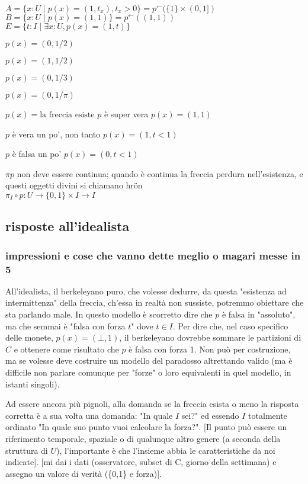 \documentclass[a4paper, 11pt]{article}
\begin{document}
$A = \{x : U \mid p(x) = (1,t_x), t_x > 0\} = p^\leftarrow(\{1\}\times (0,1])$ \\
$B = \{x : U \mid p(x) = (1,1)\} = p^\leftarrow((1,1))$ \\
$E = \{t : I \mid \exists x : U, p(x)=(1,t)\}$ 

$p(x) = (0,1/2)$

$p(x) = (1,1/2)$


$p(x) = (0,1/3)$

$p(x) = (0,1/\pi)$

$p(x) = \text{la freccia esiste}$
$p$ è super vera
$p(x)=(1,1)$

$p$ è vera un po', non tanto
$p(x) =(1,t<1)$

$p$ è falsa un po'
$p(x) =(0,t<1)$

$\pi p$ non deve essere continua; quando è continua la freccia perdura nell'esistenza, e questi oggetti divini si chiamano hrön \\
$\pi_I \circ p : U \to \{0,1\}\times I \to I$


\subsection{risposte all'idealista} 
\subsubsection{impressioni e cose che vanno dette meglio o magari messe in 5}
All'idealista, il berkeleyano puro, che volesse dedurre, da questa "esistenza ad intermittenza" della freccia, ch'essa in realtà non sussiste, potremmo obiettare che sta parlando male. In questo modello è scorretto dire che $p$ è falsa in "assoluto", ma che semmai è "falsa con forza $t$" dove $t \in I$. Per dire che, nel caso specifico delle monete, $p(x) = (\bot,1)$, il  berkeleyano dovrebbe sommare le partizioni di $C$ e ottenere come risultato che $p$ è falsa con forza 1. Non può per costruzione, ma se volesse deve costruire un modello del paradosso altrettando valido (ma è difficile non parlare comunque per "forze" o loro equivalenti in quel modello, in istanti singoli). 

Ad essere ancora più pignoli, alla domanda se la freccia esista o meno la risposta corretta è a sua volta una domanda: "In quale $I$ sei?" ed essendo $I$ totalmente ordinato "In quale suo punto vuoi calcolare la forza?". [Il punto può essere un riferimento temporale, spaziale o di qualunque altro genere (a seconda della struttura di $U$), l'importante è che l'insieme abbia le caratteristiche da noi indicate]. [mi dai i dati (osservatore, subset di C, giorno della settimana) e assegno un valore di verità (\{0,1\} e forza)]. 
\end{document}
